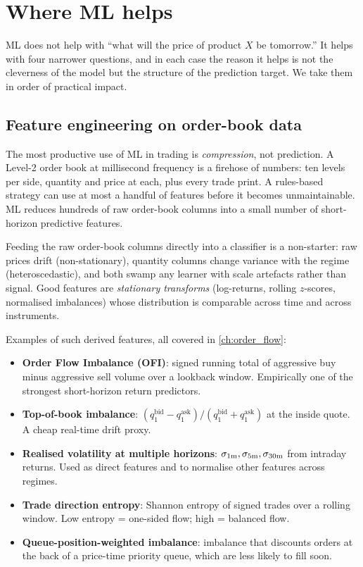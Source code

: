 \section{Where ML helps}
\label{sec:ml_where_helps}

ML does not help with ``what will the price of product $X$ be
tomorrow.'' It helps with four narrower questions, and in each case
the reason it helps is not the cleverness of the model but the
structure of the prediction target. We take them in order of
practical impact.

\subsection{Feature engineering on order-book data}
\label{subsec:ml_feature_eng}

The most productive use of ML in trading is \emph{compression},
not prediction. A Level-2 order book at millisecond frequency is
a firehose of numbers: ten levels per side, quantity and price at
each, plus every trade print. A rules-based strategy can use at most
a handful of features before it becomes unmaintainable. ML reduces
hundreds of raw order-book columns into a small number of short-horizon
predictive features.

Feeding the raw order-book columns directly into a classifier is a
non-starter: raw prices drift (non-stationary), quantity columns
change variance with the regime (heteroscedastic), and both swamp any
learner with scale artefacts rather than signal. Good features are
\emph{stationary transforms} (log-returns, rolling $z$-scores,
normalised imbalances) whose distribution is comparable across
time and across instruments.

Examples of such derived features, all covered in
\cref{ch:order_flow}:

\begin{itemize}
  \item \textbf{Order Flow Imbalance (OFI)}: signed running total
  of aggressive buy minus aggressive sell volume over a
  lookback window. Empirically one of the strongest
  short-horizon return predictors.
  \item \textbf{Top-of-book imbalance}:
  $(q^{\mathrm{bid}}_1 - q^{\mathrm{ask}}_1) / (q^{\mathrm{bid}}_1 + q^{\mathrm{ask}}_1)$
  at the inside quote. A cheap real-time drift proxy.
  \item \textbf{Realised volatility at multiple horizons}:
  $\sigma_{1\mathrm{m}}, \sigma_{5\mathrm{m}},
  \sigma_{30\mathrm{m}}$ from intraday returns. Used as direct
  features and to normalise other features across regimes.
  \item \textbf{Trade direction entropy}: Shannon entropy of
  signed trades over a rolling window. Low entropy = one-sided
  flow; high = balanced flow.
  \item \textbf{Queue-position-weighted imbalance}: imbalance
  that discounts orders at the back of a price-time priority
  queue, which are less likely to fill soon.
\end{itemize}

